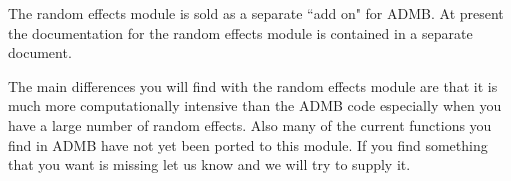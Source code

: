 
The random effects module is sold as a separate ``add on"
for ADMB.
At present the documentation for the random effects module is
contained in a separate document.

The main differences you will find with the random effects module are
that it is much more computationally intensive than the 
ADMB code especially when you have a large number of random effects.
Also many of the current functions you find in ADMB have not yet been ported to this module. If you find something that you want is missing let us know 
and we will try to supply it.
